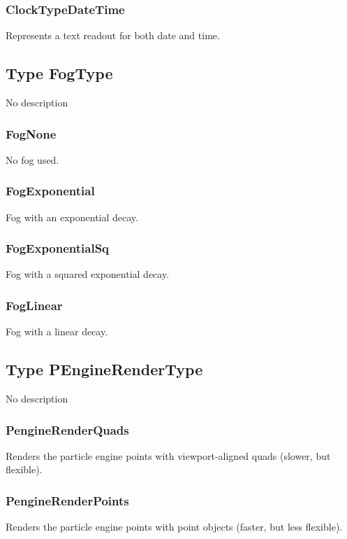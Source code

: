 \subsubsection{ClockTypeDateTime \label{T:ClockType|ClockTypeDateTime}}
Represents a text readout for both date and time.

\subsection{Type FogType \label{T:FogType}}
No description

\subsubsection{FogNone \label{T:FogType|FogNone}}
No fog used.

\subsubsection{FogExponential \label{T:FogType|FogExponential}}
Fog with an exponential decay.

\subsubsection{FogExponentialSq \label{T:FogType|FogExponentialSq}}
Fog with a squared exponential decay.

\subsubsection{FogLinear \label{T:FogType|FogLinear}}
Fog with a linear decay.

\subsection{Type PEngineRenderType \label{T:PEngineRenderType}}
No description

\subsubsection{PengineRenderQuads \label{T:PEngineRenderType|PengineRenderQuads}}
Renders the particle engine points with viewport-aligned quads (slower, but flexible).

\subsubsection{PengineRenderPoints \label{T:PEngineRenderType|PengineRenderPoints}}
Renders the particle engine points with point objects (faster, but less flexible).

